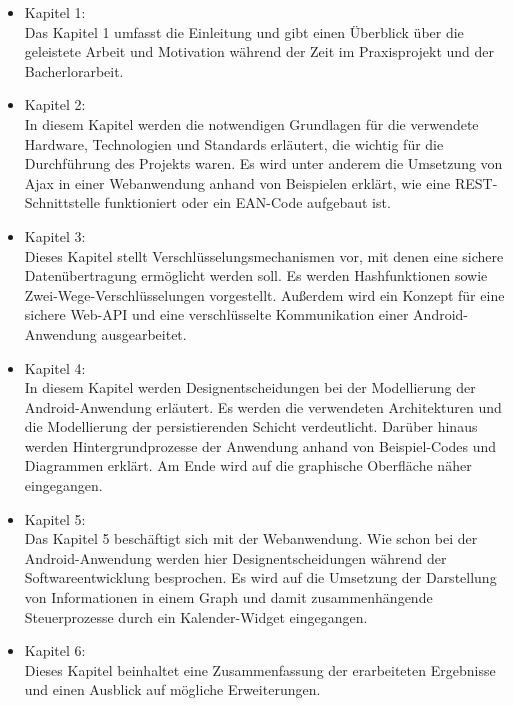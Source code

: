 \begin{itemize}
 \item Kapitel 1:\\
 Das Kapitel 1 umfasst die Einleitung und gibt einen \"Uberblick \"uber die geleistete Arbeit und Motivation 
 w\"ahrend der Zeit im Praxisprojekt und der Bacherlorarbeit.
 
 \item Kapitel 2:\\
 In diesem Kapitel werden die notwendigen Grundlagen f\"ur die verwendete Hardware, 
 Technologien und Standards erl\"autert,
 die wichtig f\"ur die Durchf\"uhrung des Projekts waren. 
 Es wird unter anderem die Umsetzung von Ajax in einer Webanwendung anhand von Beispielen erkl\"art,
 wie eine REST-Schnittstelle funktioniert oder ein EAN-Code aufgebaut ist.
 
 \item Kapitel 3:\\
 Dieses Kapitel stellt Verschl\"usselungsmechanismen vor,
 mit denen eine sichere Daten\"ubertragung erm\"oglicht werden soll.
 Es werden Hashfunktionen sowie Zwei-Wege-Verschl\"usselungen vorgestellt.
 Au\ss{}erdem wird ein Konzept f\"ur eine sichere Web-API und eine verschl\"usselte Kommunikation einer Android-Anwendung ausgearbeitet.
 
 \item Kapitel 4:\\
 In diesem Kapitel werden Designentscheidungen bei der Modellierung der Android-Anwendung erl\"autert.
 Es werden die verwendeten Architekturen und die Modellierung der persistierenden Schicht verdeutlicht.
 Dar\"uber hinaus werden Hintergrundprozesse der Anwendung anhand von Beispiel-Codes und Diagrammen erkl\"art.
 Am Ende wird auf die graphische Oberfl\"ache n\"aher eingegangen.
 
 \item Kapitel 5:\\
 Das Kapitel 5 besch\"aftigt sich mit der Webanwendung.
 Wie schon bei der Android-Anwendung werden hier Designentscheidungen w\"ahrend der Softwareentwicklung besprochen.
 Es wird auf die Umsetzung der Darstellung von Informationen in einem Graph und damit zusammenh\"angende Steuerprozesse durch ein Kalender-Widget eingegangen.
 
 \item Kapitel 6:\\
 Dieses Kapitel beinhaltet eine Zusammenfassung der erarbeiteten Ergebnisse
 und einen Ausblick auf m\"ogliche Erweiterungen.
\end{itemize}

